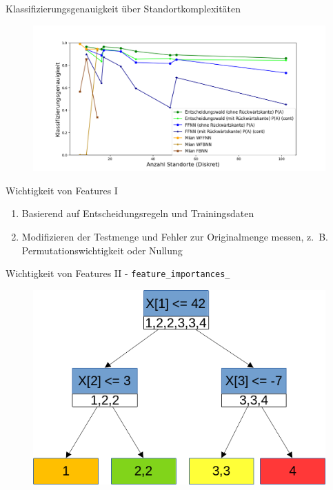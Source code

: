 \documentclass[10pt]{beamer}
\begin{document}
\begin{frame}{Klassifizierungsgenauigkeit über Standortkomplexitäten}
    \begin{figure}
        \centering
        \includegraphics[width=\linewidth]{location_recognition/best_dt_vs_knn_fb_vs_no_fb.png}
    \end{figure}
\end{frame}

\begin{frame}{Wichtigkeit von Features I}
    \begin{enumerate}
        \item Basierend auf Entscheidungsregeln und Trainingsdaten
        \item Modifizieren der Testmenge und Fehler zur Originalmenge messen, z.~B. Permutationswichtigkeit oder Nullung
    \end{enumerate}
\end{frame}

\begin{frame}{Wichtigkeit von Features II - \texttt{feature\_importances\_}}
    \begin{figure}
        \centering
        \includegraphics[width=\linewidth]{model/feature_importances.png}
    \end{figure}
\end{frame}
\end{document}
